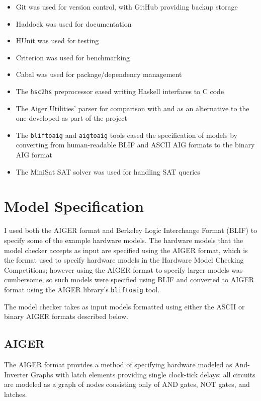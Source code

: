 \documentclass[12pt,a4paper,twoside,openright]{report}
\begin{document}
\begin{itemize}
\item Git was used for version control, with GitHub providing backup
storage
\item Haddock was used for documentation
\item HUnit was used for testing
\item Criterion was used for benchmarking
\item Cabal was used for package/dependency management
\item The {\tt hsc2hs} preprocessor eased writing Haskell interfaces to
C code
\item The Aiger Utilities' parser for comparison with and as an
alternative to the one developed as part of the project
\item The {\tt bliftoaig} and {\tt aigtoaig} tools eased the specification
of models by converting from human-readable BLIF and ASCII AIG
formats to the binary AIG format
\item The MiniSat SAT solver was used for handling SAT queries
\end{itemize}

\section{Model Specification}


I used both the AIGER format and Berkeley Logic Interchange Format (BLIF)
to specify some of the example hardware models.
The hardware models that the model checker accepts as input
are specified using the AIGER format, which is the format used to specify
hardware models in the Hardware Model Checking Competitions;
however using the AIGER format to specify larger models was cumbersome,
so such models were specified using BLIF and converted to AIGER format
using the AIGER library's \verb,bliftoaig, tool.

The model checker takes as input models formatted using either the ASCII or
binary AIGER formats described below.

\subsection{AIGER}

The AIGER format provides a method of specifying hardware modeled as
And-Inverter Graphs with latch elements providing single clock-tick
delays: all circuits are modeled as a graph of nodes consisting only of
AND gates, NOT gates, and latches.
\end{document}
